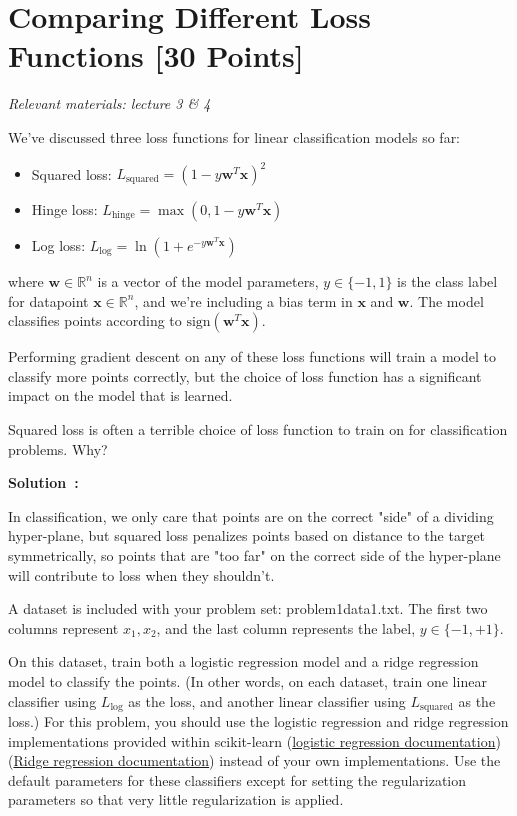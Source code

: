 \documentclass{article}
\newcounter{problem}[section]
\newcommand\materials[1]
  {\begingroup
    \setlength{\parskip}{0em}
    \textit{\hspace*{2em} Relevant materials: #1} \par \vspace{1em}
  \endgroup}
\newenvironment{solution}[1][]
    {\par\medskip \begin{mdframed}\textbf{Solution~\Alph{problem}#1:} \begin{em}}
    {\end{em}\medskip\end{mdframed}\medskip}
\begin{document}

\newpage
\section{Comparing Different Loss Functions [30 Points]}
\materials{lecture 3 \& 4}

We've discussed three loss functions for linear classification models so far:
\begin{itemize}
\item Squared loss: $L_\text{squared} = (1 - y\mathbf{w}^T\mathbf{x})^2$
\item Hinge loss: $L_\text{hinge} = \max(0, 1 - y\mathbf{w}^T\mathbf{x})$
\item Log loss: $L_\text{log} = \ln(1 + e^{-y\mathbf{w}^T\mathbf{x}})$
\end{itemize}
where $\mathbf{w} \in \mathbb{R}^n$ is a vector of the model parameters, $y \in \{-1,1\}$ is the class label for datapoint $\mathbf{x} \in \mathbb{R}^n$, and we're including a bias term in $\mathbf{x}$ and $\mathbf{w}$.  The model classifies points according to $\text{sign}(\mathbf{w}^T\mathbf{x})$.

Performing gradient descent on any of these loss functions will train a model to classify more points correctly, but the choice of loss function has a significant impact on the model that is learned.

\problem[3]
Squared loss is often a terrible choice of loss function to train on for classification problems.  Why?

\begin{solution}
  In classification, we only care that points are on the correct "side" of a dividing hyper-plane, but squared loss penalizes points based on distance to the target symmetrically, so points that are "too far" on the correct side of the hyper-plane will contribute to loss when they shouldn't.
\end{solution}

\problem[9]
A dataset is included with your problem set: problem1data1.txt. The first two columns represent $x_1, x_2$, and the last column represents the label, $y \in \{-1,+1\}$.

On this dataset, train both a logistic regression model and a ridge regression model to classify the points.  (In other words, on each dataset, train one linear classifier using $L_\text{log}$ as the loss, and another linear classifier using $L_\text{squared}$ as the loss.) For this problem, you should use the logistic regression and ridge regression implementations provided within scikit-learn 
(\href{http://scikit-learn.org/stable/modules/generated/sklearn.linear_model.LogisticRegression.html}{logistic regression documentation})
(\href{http://scikit-learn.org/stable/modules/generated/sklearn.linear_model.Ridge.html}{Ridge regression documentation})
instead of your own implementations. Use the default parameters for these classifiers except for setting the regularization parameters so that very little regularization is applied.
\end{document}
